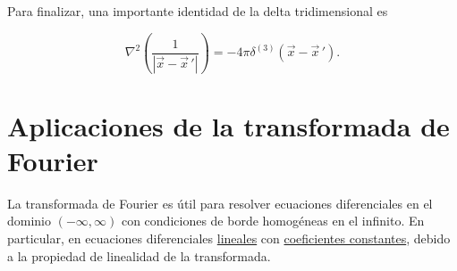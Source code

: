 Para finalizar, una importante identidad de la delta tridimensional es 
\begin{shaded}
    \begin{equation}
        \nabla^2 \left(\frac{1}{|\Vec{x} - \Vec{x}\, '|}\right) = - 4\pi \delta^{(3)}(\Vec{x} - \Vec{x}\, ').
    \end{equation}
\end{shaded}

\section{Aplicaciones de la transformada de Fourier}

La transformada de Fourier es útil para resolver ecuaciones diferenciales en el dominio $(-\infty, \infty)$ con condiciones de borde homogéneas en el infinito. En particular, en ecuaciones diferenciales \underline{lineales} con \underline{coeficientes constantes}, debido a la propiedad de linealidad de la transformada.

